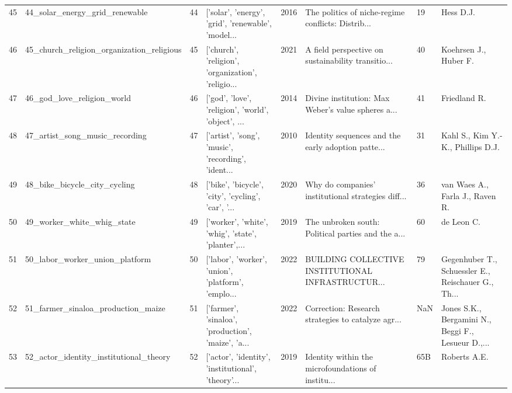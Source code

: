 \begin{tabular}{rlrlrlll}
         45 &                     44\_solar\_energy\_grid\_renewable &        44 & ['solar', 'energy', 'grid', 'renewable', 'model... &          2016 & The politics of niche-regime conflicts: Distrib... &      19 &                                          Hess D.J. \\
         46 &          45\_church\_religion\_organization\_religious &        45 & ['church', 'religion', 'organization', 'religio... &          2021 & A field perspective on sustainability transitio... &      40 &                              Koehrsen J., Huber F. \\
         47 &                         46\_god\_love\_religion\_world &        46 & ['god', 'love', 'religion', 'world', 'object', ... &          2014 & Divine institution: Max Weber's value spheres a... &      41 &                                       Friedland R. \\
         48 &                     47\_artist\_song\_music\_recording &        47 & ['artist', 'song', 'music', 'recording', 'ident... &          2010 & Identity sequences and the early adoption patte... &      31 &                  Kahl S., Kim Y.-K., Phillips D.J. \\
         49 &                       48\_bike\_bicycle\_city\_cycling &        48 & ['bike', 'bicycle', 'city', 'cycling', 'car', '... &          2020 & Why do companies’ institutional strategies diff... &      36 &                    van Waes A., Farla J., Raven R. \\
         50 &                         49\_worker\_white\_whig\_state &        49 & ['worker', 'white', 'whig', 'state', 'planter',... &          2019 & The unbroken south: Political parties and the a... &      60 &                                         de Leon C. \\
         51 &                     50\_labor\_worker\_union\_platform &        50 & ['labor', 'worker', 'union', 'platform', 'emplo... &          2022 & BUILDING COLLECTIVE INSTITUTIONAL INFRASTRUCTUR... &      79 & Gegenhuber T., Schuessler E., Reischauer G., Th... \\
         52 &                 51\_farmer\_sinaloa\_production\_maize &        51 & ['farmer', 'sinaloa', 'production', 'maize', 'a... &          2022 & Correction: Research strategies to catalyze agr... &     NaN & Jones S.K., Bergamini N., Beggi F., Lesueur D.,... \\
         53 &             52\_actor\_identity\_institutional\_theory &        52 & ['actor', 'identity', 'institutional', 'theory'... &          2019 & Identity within the microfoundations of institu... &     65B &                                       Roberts A.E. \\

\end{tabular}
